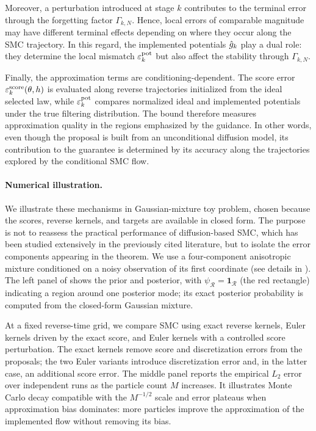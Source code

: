 \documentclass[11pt]{article}
\theoremstyle{plain}
\theoremstyle{definition}
\theoremstyle{remark}
\begin{document}
Moreover, a perturbation introduced at stage $k$ contributes to the terminal error through the forgetting factor $\Gamma_{k,N}$. Hence, local errors of comparable magnitude may have different terminal effects depending on where they occur along the SMC trajectory. In this regard, the implemented potentials $\approxpot{k}$ play a dual role: they determine the local mismatch $\varepsilon_k^{\rm pot}$ but also affect the stability through $\Gamma_{k,N}$.

Finally, the approximation terms are conditioning-dependent. The score error $\varepsilon_k^{\rm score}(\theta,h)$ is evaluated along reverse trajectories initialized from the ideal selected law, while $\varepsilon_k^{\rm pot}$ compares normalized ideal and implemented potentials under the true filtering distribution. The bound therefore measures approximation quality in the regions emphasized by the guidance. In other words, even though the proposal is built from an unconditional diffusion model, its contribution to the guarantee is determined by its accuracy along the trajectories explored by the conditional SMC flow.

\paragraph{Numerical illustration.} We illustrate these mechanisms in Gaussian-mixture toy problem, chosen because the scores, reverse kernels, and targets are available in closed form. The purpose is not to reassess the practical performance of diffusion-based SMC, which has been studied extensively in the previously cited literature, but to isolate the error components appearing in the theorem. We use a four-component anisotropic mixture conditioned on a noisy observation of its first coordinate (see details in ).  The left panel of  shows the prior and posterior, with $\psi_{\mathcal R}=\mathbf 1_{\mathcal R}$ (the red rectangle) indicating a region around one posterior mode; its exact posterior probability is computed from the closed-form Gaussian mixture.

At a fixed reverse-time grid, we compare SMC using exact reverse kernels, Euler kernels driven by the exact score, and Euler kernels with a controlled score perturbation. The exact kernels remove score and discretization errors from the proposals; the two Euler variants introduce discretization error and, in the latter case, an additional score error. The middle panel reports the empirical $L_2$ error over independent runs as the particle count $M$ increases. It illustrates Monte Carlo decay compatible with the $M^{-1/2}$ scale and error plateaus when approximation bias dominates: more particles improve the approximation of the implemented flow without removing its bias.
\end{document}

